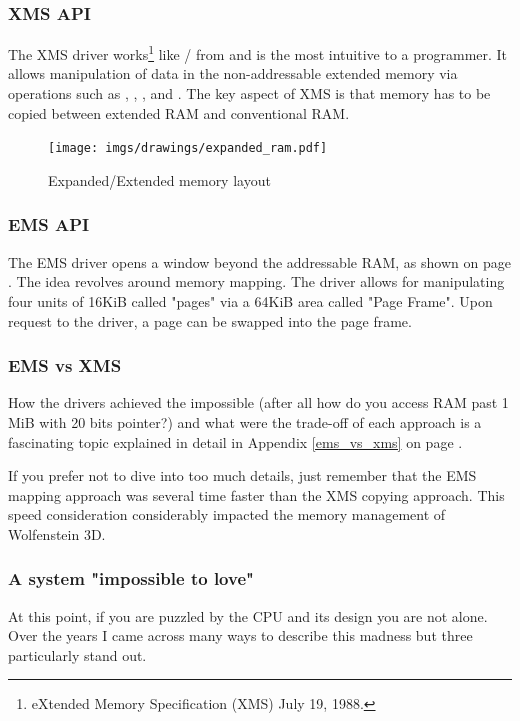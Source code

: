 \documentclass[book.tex]{subfiles}
\begin{document}
\subsubsection{XMS API}
The XMS driver works\footnote{eXtended Memory Specification (XMS) July 19, 1988.} like / from  and is the most intuitive to a programmer. It allows manipulation of data in the non-addressable extended memory via operations such as , , , and . The key aspect of XMS is that memory has to be copied between extended RAM and conventional RAM.\\
\par


\begin{figure}[H]
\centering
\texttt{[image: imgs/drawings/expanded\_ram.pdf]}
\caption{Expanded/Extended memory layout}
\label{fig:ems_xms_layout}
\end{figure}





\subsubsection{EMS API}
The EMS driver opens a window beyond the addressable RAM, as shown on page \pageref{fig:ems_xms_layout}. The idea revolves around memory mapping. The driver allows for manipulating four units of 16KiB called "pages" via a 64KiB area called "Page Frame". Upon request to the driver, a page can be swapped into the page frame.\\
\par


\subsubsection{EMS vs XMS}
How the drivers achieved the impossible (after all how do you access RAM past 1 MiB with 20 bits pointer?) and what were the trade-off of each approach is a fascinating topic explained in detail in Appendix \ref{ems_vs_xms} on page \pageref{ems_vs_xms}.\\
\par
 If you prefer not to dive into too much details, just remember that the EMS mapping approach was several time faster than the XMS copying approach. This speed consideration considerably impacted the memory management of Wolfenstein 3D.




\subsubsection{A system "impossible to love"}
At this point, if you are puzzled by the CPU and its design you are not alone. Over the years I came across many ways to describe this madness but three particularly stand out.\\
\end{document}
